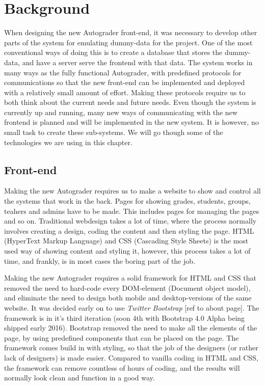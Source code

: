 \documentclass[12pt,a4paper]{report}
\begin{document}
\chapter{Background}

When designing the new Autograder front-end, it was necessary to develop other parts of the system for emulating dummy-data for the project. One of the most conventional ways of doing this is to create a database that stores the dummy-data, and have a server serve the frontend with that data. The system works in many ways as the fully functional Autograder, with predefined protocols for communications so that the new front-end can be implemented and deployed with a relatively small amount of effort. Making these protocols require us to both think about the current needs and future needs. Even though the system is currently up and running, many new ways of communicating with the new frontend is planned and will be implemented in the new system. It is however, no small task to create these sub-systems. We will go though some of the technologies we are using in this chapter.

\section{Front-end}
Making the new Autograder requires us to make a website to show and control all the systems that work in the back. Pages for showing grades, students, groups, teahers and admins have to be made. This includes pages for managing the pages and so on. Traditional webdesign takes a lot of time, where the process normally involves creating a design, coding the content and then styling the page. HTML (HyperText Markup Language) and CSS (Cascading Style Sheets) is the most used way of showing content and styling it, however, this process takes a lot of time, and frankly, is in most cases the boring part of the job.

Making the new Autograder requires a solid framework for HTML and CSS that removed the need to hard-code every DOM-element (Document object model), and eliminate the need to design both mobile and desktop-versions of the same website. It was decided early on to use \textit{Twitter Bootstrap} [ref to about page]. The framework is in it's third iteration (soon 4th with Bootstrap 4.0 Alpha being shipped early 2016). Bootstrap removed the need to make all the elements of the page, by using predefined components that can be placed on the page. The framework comes build in with styling, so that the job of the designers (or rather lack of designers) is made easier. Compared to vanilla coding in HTML and CSS, the framework can remove countless of hours of coding, and the results will normally look clean and function in a good way.
\end{document}
